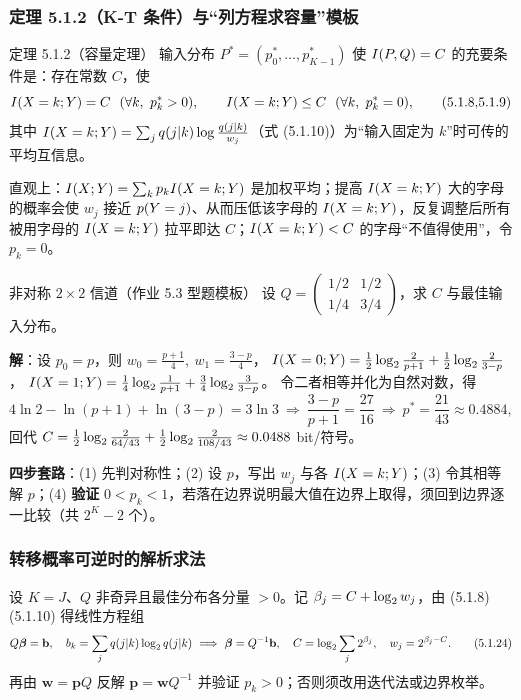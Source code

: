 \subsubsection{定理 5.1.2（K-T 条件）与“列方程求容量”模板}

\begin{thmbox}{定理 5.1.2（容量定理）}
输入分布 $P^*=(p_0^*,\dots,p_{K-1}^*)$ 使 $I\!\left(P,Q\right)=C$ 的充要条件是：存在常数 $C$，使
\begin{equation}
\I{X=k;Y}=C\ \ (\forall k,\ p_k^*>0),\qquad
\I{X=k;Y}\le C\ \ (\forall k,\ p_k^*=0),\tag{5.1.8,5.1.9}
\end{equation}
其中 $I\!\left(X=k;Y\right)=\sum_{j}q(j|k)\log\frac{q(j|k)}{w_j}$（式 (5.1.10)）为“输入固定为 $k$”时可传的平均互信息。
\end{thmbox}

直观上：$I\!\left(X;Y\right)=\sum_kp_kI\!\left(X=k;Y\right)$ 是加权平均；提高 $I\!\left(X=k;Y\right)$ 大的字母的概率会使 $w_j$ 接近 $p\!\left(Y=j\right)$、从而压低该字母的 $I\!\left(X=k;Y\right)$，反复调整后所有被用字母的 $I\!\left(X=k;Y\right)$ 拉平即达 $C$；$I\!\left(X=k;Y\right)<C$ 的字母“不值得使用”，令 $p_k=0$。

\begin{example}{非对称 $2\times2$ 信道（作业 5.3 型题模板）}
设 $Q=\begin{pmatrix}1/2&1/2\\1/4&3/4\end{pmatrix}$，求 $C$ 与最佳输入分布。

\textbf{解}：设 $p_0=p$，则 $w_0=\frac{p+1}{4},\ w_1=\frac{3-p}{4}$，
$I\!\left(X=0;Y\right)=\frac12\log_{2}\frac{2}{p+1}+\frac12\log_{2}\frac{2}{3-p}$，
$I\!\left(X=1;Y\right)=\frac14\log_{2}\frac{1}{p+1}+\frac34\log_{2}\frac{3}{3-p}$。
令二者相等并化为自然对数，得
\begin{equation*}
4\ln2-\ln(p+1)+\ln(3-p)=3\ln3
\ \Longrightarrow\ \frac{3-p}{p+1}=\frac{27}{16}
\ \Longrightarrow\ p^*=\frac{21}{43}\approx0.4884,
\end{equation*}
回代 $C=\frac12\log_{2}\frac{2}{64/43}+\frac12\log_{2}\frac{2}{108/43}\approx0.0488$ bit/符号。

\textbf{四步套路}：(1) 先判对称性；(2) 设 $p$，写出 $w_j$ 与各 $I\!\left(X=k;Y\right)$；(3) 令其相等解 $p$；(4) \textbf{验证} $0<p_k<1$，若落在边界说明最大值在边界上取得，须回到边界逐一比较（共 $2^K-2$ 个）。
\end{example}

\subsubsection{转移概率可逆时的解析求法}

设 $K=J$、$Q$ 非奇异且最佳分布各分量 $>0$。记 $\beta_j=C+\log_{2} w_j$，由 (5.1.8)(5.1.10) 得线性方程组
\begin{equation}
Q\boldsymbol{\beta}=\mathbf{b},\quad b_k=\sum_j q(j|k)\log_{2} q(j|k)
\ \Longrightarrow\ \boldsymbol{\beta}=Q^{-1}\mathbf{b},\quad
C=\log_{2}\sum_j2^{\beta_j},\quad w_j=2^{\beta_j-C}.\tag{5.1.24}
\end{equation}
再由 $\mathbf{w}=\mathbf{p}Q$ 反解 $\mathbf{p}=\mathbf{w}Q^{-1}$ 并验证 $p_k>0$；否则须改用迭代法或边界枚举。

